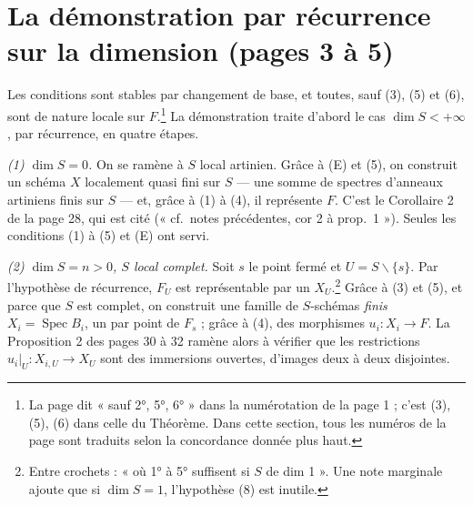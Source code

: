 \documentclass[11pt,a4paper]{article}
\begin{document}
\section*{La démonstration par récurrence sur la dimension (pages 3 à 5)}

Les conditions sont stables par changement de base, et toutes, sauf (3), (5)
et (6), sont de nature locale sur $F$.\footnote{La page dit « sauf 2°, 5°,
6° » dans la numérotation de la page 1 ; c'est (3), (5), (6) dans celle du
Théorème. Dans cette section, tous les numéros de la page sont traduits
selon la concordance donnée plus haut.} La démonstration traite d'abord le
cas $\dim S < +\infty$, par récurrence, en quatre étapes.

\emph{(1) $\dim S = 0$.} On se ramène à $S$ local artinien. Grâce à (E) et
(5), on construit un schéma $X$ localement quasi fini sur $S$ — une somme de
spectres d'anneaux artiniens finis sur $S$ — et, grâce à (1) à (4), il
représente $F$. C'est le Corollaire 2 de la page 28, qui est cité (« cf.\
notes précédentes, cor 2 à prop.\ 1 »). Seules les conditions (1) à (5) et
(E) ont servi.

\emph{(2) $\dim S = n > 0$, $S$ local complet.} Soit $s$ le point fermé et
$U = S \smallsetminus \{s\}$. Par l'hypothèse de récurrence, $F_U$ est
représentable par un $X_U$.\footnote{Entre crochets : « où 1° à 5° suffisent
si $S$ de dim 1 ». Une note marginale ajoute que si $\dim S = 1$, l'hypothèse
(8) est inutile.} Grâce à (3) et (5), et parce que $S$ est complet, on
construit une famille de $S$-schémas \emph{finis} $X_i =
\operatorname{Spec} B_i$, un par point de $F_s$ ; grâce à (4), des morphismes
$u_i : X_i \to F$. La Proposition 2 des pages 30 à 32 ramène alors à
vérifier que les restrictions $u_i|_U : X_{i,U} \to X_U$ sont des immersions
ouvertes, d'images deux à deux disjointes.
\end{document}
